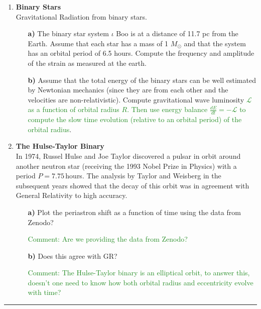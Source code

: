 \documentclass[11pt]{article}
\newcommand{\zach}[1]{\textcolor{ForestGreen}{#1}}
\begin{document}
\begin{enumerate}
\item
{\bf Binary Stars} \\
Gravitational Radiation from binary stars.
\begin{itemize}

\item[\bf a)] The binary star system $\iota$ Boo is at a distance of
  11.7 pc from the Earth. Assume that each star has a mass of 1
  $M_{\odot}$ and that the system has an orbital period of 6.5
  hours. Compute the frequency and amplitude of the strain as measured
  at the earth.

\item[\bf b)] Assume that the total energy of the binary stars can
  be well estimated by Newtonian mechanics (since they are from each
  other and the velocities are non-relativistic). Compute
  gravitational wave luminosity \zach{ $\mathcal{L}$ as a function of orbital radius $R$.}  \zach{Then use energy balance $\frac{dE}{dt}=-\mathcal{L}$ to compute the slow time evolution (relative to an orbital period) of the orbital radius}.

\end{itemize}


\item
{\bf The Hulse-Taylor Binary} \\
In 1974, Russel Hulse and Joe Taylor discovered a pulsar in orbit
around another neutron star (receiving the 1993 Nobel Prize in
Physics) with a period $P = 7.75$\,hours. The analysis by Taylor and Weisberg in
the subsequent years showed that the decay of this orbit was in
agreement with General Relativity to high accuracy.
\begin{itemize}

\item[\bf a)] Plot the periastron shift as a function of time using
  the data from Zenodo?
  
  \zach{Comment: Are we providing the data from Zenodo?}

\item[\bf b)] Does this agree with GR?

\zach{Comment: The Hulse-Taylor binary is an elliptical orbit, to answer this, doesn't one need to know how both orbital radius and eccentricity evolve with time?}

\end{itemize}
\end{enumerate}

\bigskip
{\color{Sepia} \hrule}
\end{document}
